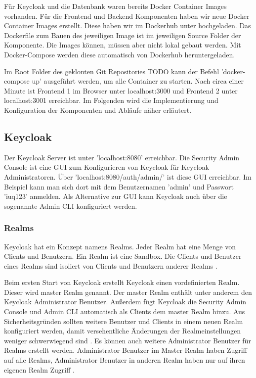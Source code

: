Für Keycloak und die Datenbank waren bereits Docker Container Images vorhanden. Für die Frontend und Backend Komponenten haben wir neue Docker Container Images erstellt. Diese haben wir im Dockerhub unter \cite{EB42} hochgeladen. Das Dockerfile zum Bauen des jeweiligen Image ist im jeweiligen Source Folder der Komponente. Die Images können, müssen aber nicht lokal gebaut werden. Mit Docker-Compose werden diese automatisch von Dockerhub heruntergeladen.

Im Root Folder des geklonten Git Repositories TODO kann der Befehl 'docker-compose up' ausgeführt werden, um alle Container zu starten. Nach circa einer Minute ist Frontend 1 im Browser unter localhost:3000 und Frontend 2 unter localhost:3001 erreichbar. Im Folgenden wird die Implementierung und Konfiguration der Komponenten und Abläufe näher erläutert.

\subsection{Keycloak}

Der Keycloak Server ist unter 'localhost:8080' erreichbar. Die Security Admin Console ist eine GUI zum Konfigurieren von Keycloak für Keycloak Administratoren. Über 'localhost:8080/auth/admin/' ist diese GUI erreichbar. Im Beispiel kann man sich dort mit dem Benutzernamen 'admin' und Passwort 'iuq123' anmelden. Als Alternative zur GUI kann Keycloak auch über die sogenannte Admin CLI konfiguriert werden.

\subsubsection{Realms}

Keycloak hat ein Konzept namens Realms. Jeder Realm hat eine Menge von Clients und Benutzern. Ein Realm ist eine Sandbox. Die Clients und Benutzer eines Realms sind isoliert von Clients und Benutzern anderer Realms \cite{EB46}.

Beim ersten Start von Keycloak erstellt Keycloak einen vordefinierten Realm. Dieser wird master Realm genannt. Der master Realm enthält unter anderem den Keycloak Administrator Benutzer. Außerdem fügt Keycloak die Security Admin Console und Admin CLI automatisch als Clients dem master Realm hinzu. Aus Sicherheitsgründen sollten weitere Benutzer und Clients in einem neuen Realm konfiguriert werden, damit versehentliche Änderungen der Realmeinstellungen weniger schwerwiegend sind \cite{EB47}. Es können auch weitere Administrator Benutzer für Realms erstellt werden. Administrator Benutzer im Master Realm haben Zugriff auf alle Realms,  Administrator Benutzer in anderen Realm haben nur auf ihren eigenen Realm Zugriff \cite{EB47}.

